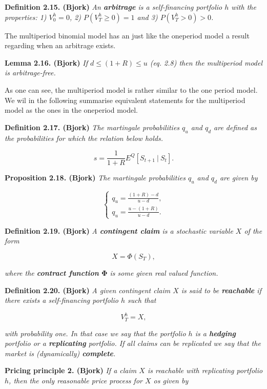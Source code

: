 \documentclass[
]{book}
\begin{document}
\textbf{Definition 2.15. (Bjork)} \emph{An \textbf{arbitrage} is a self-financing portfolio \(h\) with the properties: 1) \(V^h_0=0\), 2) \(P(V^h_T\ge 0)=1\) and 3) \(P(V^h_T>0)>0\).}

The multiperiod binomial model has an just like the oneperiod model a result regarding when an arbitrage exists.

\textbf{Lemma 2.16. (Bjork)} \emph{If \(d\le (1+R)\le u\) (eq. 2.8) then the multiperiod model is arbitrage-free.}

As one can see, the multiperiod model is rather similar to the one period model. We wil in the following summarise equivalent statements for the multiperiod model as the ones in the oneperiod model.

\textbf{Definition 2.17. (Bjork)} \emph{The martingale probabilities \(q_u\) and \(q_d\) are defined as the probabilities for which the relation below holds.}

\[
s=\frac{1}{1+R}E^Q[S_{t+1}\ \vert\ S_t].
\]

\textbf{Proposition 2.18. (Bjork)} \emph{The martingale probabilities \(q_u\) and \(q_d\) are given by}

\[
\left\{\begin{matrix}q_u=\frac{(1+R)-d}{u-d},\\ q_u=\frac{u-(1+R)}{u-d}.\end{matrix}\right.
\]

\textbf{Definition 2.19. (Bjork)} \emph{A \textbf{contingent claim} is a stochastic variable \(X\) of the form}

\[
X=\Phi(S_T),
\]

\emph{where the \textbf{contract function} \(\mathbf{\Phi}\) is some given real valued function.}

\textbf{Definition 2.20. (Bjork)} \emph{A given contingent claim \(X\) is said to be \textbf{reachable} if there exists a self-financing portfolio \(h\) such that}

\[
V_T^h=X,
\]

\emph{with probability one. In that case we say that the portfolio \(h\) is a \textbf{hedging} portfolio or a \textbf{replicating} portfolio. If all claims can be replicated we say that the market is \emph{(dynamically)} \textbf{complete}.}

\textbf{Pricing principle 2. (Bjork)} \emph{If a claim \(X\) is reachable with replicating portfolio \(h\), then the only reasonable price process for \(X\) os given by}
\end{document}
